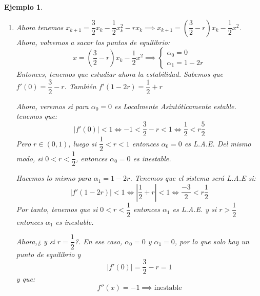 \documentclass[11pt, a4paper, titlepage]{article}
\theoremstyle{theorem-style}
\theoremstyle{definition-style}
\theoremstyle{remark-style}
\theoremstyle{example-style}
\newtheorem*{ejemplo}{Ejemplo}
\begin{document}
\begin{ejemplo}
\begin{enumerate}
	Por tanto, tenemos que tomar un $x_0$. Sabemos que $\alpha_1 < x_0$ pues de lo contrario, la población de peces se extinguiría. Así:
	\[
	\frac{1 - \sqrt{1-8b}}{2} < x_0 \implies b < \dfrac{1}{2}x_0 -(1-x_0)
	\]
	De esta forma, para llegar al punto de equilibrio A.E., hay que tomar $0 < b < min\{\ \dfrac{1}{8},\ \dfrac{1}{2}x_0 -(1-x_0) \}$
	
	Ahora, si $b= \dfrac{1}{8}$, entonces $\alpha_0 = \alpha_1 = \dfrac{1}{2}$ y $f'(\dfrac{1}{2}) = 1$ y $f''(x) = -1 < 0 \implies \alpha= \dfrac{1}{2}$ es inestable
	
	Por tanto, si tomáramos $x_0 > \dfrac{1}{2} \implies x_k$ converge hacia $\dfrac{1}{2} = \alpha$.
	Si tomáramos $x_0 < \dfrac{1}{2} \implies x_k$ diverge negativamente.
	
	\item Ahora tenemos $x_{k+1}= \dfrac{3}{2}x_k - \dfrac{1}{2} x_k^2 -rx_k \implies x_{k+1} = (\dfrac{3}{2}-r)x_k - \dfrac{1}{2}x^2$.
	Ahora, volvemos a sacar los puntos de equilibrio:
	\[
	x = (\dfrac{3}{2}-r)x_k - \dfrac{1}{2}x^2 \implies \begin{cases}
	\alpha_0 = 0\\
	\alpha_1 = 1-2r
\end{cases}
	\]
	Entonces, tenemos que estudiar ahora la estabilidad. Sabemos que $f'(0) = \dfrac{3}{2} -r$. También $f'(1-2r) = \dfrac{1}{2} + r$
	
	Ahora, veremos si para $\alpha_0 = 0$ es Localmente Asintóticamente estable. tenemos que:
	\[
	|f'(0)|<1 \iff -1 < \dfrac{3}{2}-r < 1 \iff \dfrac{1}{2} < r \dfrac{5}{2}
	\]
	Pero $r \in (0,1)$, luego si $\dfrac{1}{2} < r < 1$ entonces $\alpha_0 = 0$ es L.A.E. Del mismo modo, si $0 < r < \dfrac{1}{2}$, entonces $\alpha_0 = 0$ es inestable.
	
	Hacemos lo mismo para $\alpha_1 = 1-2r$.  Tenemos que el sistema será L.A.E si:
	\[
	|f'(1-2r)| < 1 \iff |\dfrac{1}{2}+r| < 1 \iff \dfrac{-3}{2} < r \dfrac{1}{2}
	\]
	Por tanto, tenemos que si $0 < r < \dfrac{1}{2}$ entonces $\alpha_1$ es L.A.E. y si $r> \dfrac{1}{2}$ entonces $\alpha_1$ es inestable.
	
	Ahora,¿ y si $r= \dfrac{1}{2}$?. En ese caso, $\alpha_0 = 0$ y $\alpha_1 = 0$, por lo que solo hay un punto de equilibrio y
	\[
	|f'(0)|= \dfrac{3}{2}-r = 1
	\]
	y que:
	\[
	f''(x) =  -1 \implies \text{inestable}
	\]
\end{enumerate}
\end{ejemplo}


\end{document}
